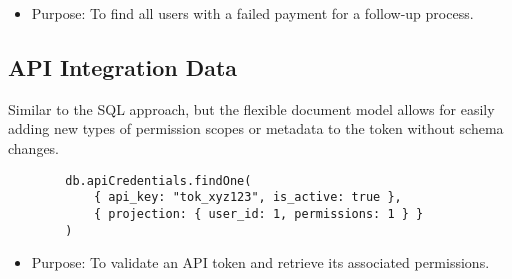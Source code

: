     \begin{itemize}
        \item Purpose: To find all users with a failed payment for a follow-up process.
    \end{itemize}

\subsection{API Integration Data}
    Similar to the SQL approach, but the flexible document model allows for easily adding new types of permission scopes or metadata to the token without schema changes.
    \begin{verbatim}
        db.apiCredentials.findOne(
            { api_key: "tok_xyz123", is_active: true },
            { projection: { user_id: 1, permissions: 1 } }
        )
    \end{verbatim}

    \begin{itemize}
        \item Purpose: To validate an API token and retrieve its associated permissions.
    \end{itemize}
